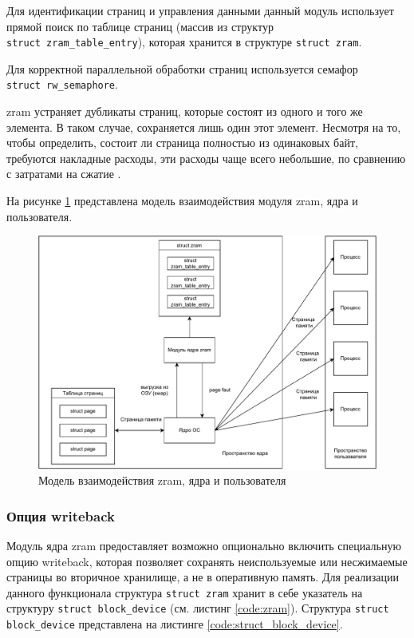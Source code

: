 Для идентификации страниц и управления данными данный модуль использует прямой поиск по таблице страниц (массив из структур \\\texttt{struct zram\_table\_entry}), которая хранится в структуре \texttt{struct zram}.

Для корректной параллельной обработки страниц используется семафор \\\texttt{struct rw\_semaphore}.

zram устраняет дубликаты страниц, которые состоят из одного и того же элемента. В таком случае, сохраняется лишь один этот элемент. Несмотря на то, чтобы определить, состоит ли страница полностью из одинаковых байт, требуются накладные расходы, эти расходы чаще всего небольшие, по сравнению с затратами на сжатие \cite{in-kernel-memory-compression}.

На рисунке \ref{fig:zram-kernel} представлена модель взаимодействия модуля zram, ядра и пользователя.

\begin{figure}[h]
	\centering
	\includegraphics[width=\textwidth]{img/zram-kernel.pdf}
	\caption{Модель взаимодействия zram, ядра и пользователя}
	\label{fig:zram-kernel}
\end{figure}

\subsubsection{Опция writeback}

Модуль ядра zram предоставляет возможно опционально включить специальную опцию writeback, которая позволяет сохранять неиспользуемые или несжимаемые страницы во вторичное хранилище, а не в оперативную память. Для реализации данного функционала структура \texttt{struct zram} хранит в себе указатель на структуру \texttt{struct block\_device} (см. листинг \ref{code:zram}). Структура \texttt{struct block\_device} представлена на листинге \ref{code:struct_block_device}.

